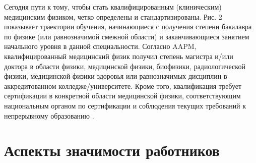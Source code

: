 \documentclass[a4paper,10pt]{extarticle}
\begin{document}
Сегодня пути к тому, чтобы стать квалифицированным (клиническим) медицинским физиком, четко определены и стандартизированы. Рис. 2 показывает траектории обучения, начинающиеся с получения степени бакалавра по физике (или равнозначимой смежной области) и заканчивающиеся занятием начального уровня в данной специальности.
Согласно AAPM, квалифицированный медицинский физик получил степень магистра и/или доктора в области физики, медицинской физики, биофизики, радиологической физики, медицинской физики здоровья или равнозначимых дисциплин в аккредитованном колледже/университете. Кроме того, квалификация требует сертификации в конкретной области медицинской физики, соответствующим национальным органом по сертификации и соблюдения текущих требований к непрерывному образованию \cite{AAPM 2016b}.





%



\section{Аспекты значимости работников}

\subsection{}




\subsection{}
\end{document}
